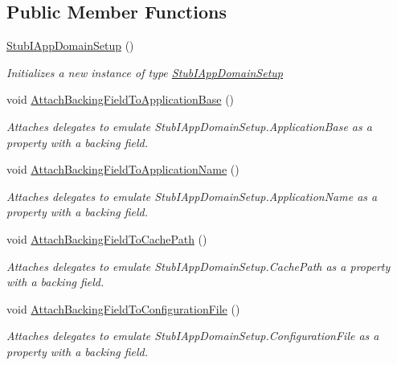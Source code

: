 \subsection*{Public Member Functions}
\begin{DoxyCompactItemize}
\item 
\hyperlink{class_system_1_1_fakes_1_1_stub_i_app_domain_setup_a95cf65c180082a0a6e7d38ac569c0cde}{Stub\-I\-App\-Domain\-Setup} ()
\begin{DoxyCompactList}\small\item\em Initializes a new instance of type \hyperlink{class_system_1_1_fakes_1_1_stub_i_app_domain_setup}{Stub\-I\-App\-Domain\-Setup}\end{DoxyCompactList}\item 
void \hyperlink{class_system_1_1_fakes_1_1_stub_i_app_domain_setup_a2a098865cd51d9145d6067aaab30bb0a}{Attach\-Backing\-Field\-To\-Application\-Base} ()
\begin{DoxyCompactList}\small\item\em Attaches delegates to emulate Stub\-I\-App\-Domain\-Setup.\-Application\-Base as a property with a backing field.\end{DoxyCompactList}\item 
void \hyperlink{class_system_1_1_fakes_1_1_stub_i_app_domain_setup_a183f9f256bedb4f364e0565adc914864}{Attach\-Backing\-Field\-To\-Application\-Name} ()
\begin{DoxyCompactList}\small\item\em Attaches delegates to emulate Stub\-I\-App\-Domain\-Setup.\-Application\-Name as a property with a backing field.\end{DoxyCompactList}\item 
void \hyperlink{class_system_1_1_fakes_1_1_stub_i_app_domain_setup_adf6a931e7b237bc28ddb52c7e2866a09}{Attach\-Backing\-Field\-To\-Cache\-Path} ()
\begin{DoxyCompactList}\small\item\em Attaches delegates to emulate Stub\-I\-App\-Domain\-Setup.\-Cache\-Path as a property with a backing field.\end{DoxyCompactList}\item 
void \hyperlink{class_system_1_1_fakes_1_1_stub_i_app_domain_setup_a89ac6d89117a019041b621585c87ef9a}{Attach\-Backing\-Field\-To\-Configuration\-File} ()
\begin{DoxyCompactList}\small\item\em Attaches delegates to emulate Stub\-I\-App\-Domain\-Setup.\-Configuration\-File as a property with a backing field.\end{DoxyCompactList}\item 

\end{DoxyCompactItemize}
